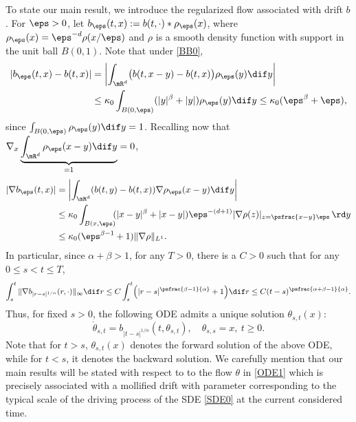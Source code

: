 To state our main result, we introduce the regularized flow associated with drift $b$.
For $\eps>0$, let $b_\eps(t,x):=b(t,\cdot)*\rho_\eps(x)$, where $\rho_\eps(x)=\eps^{-d}\rho(x/\eps)$
and $\rho$ is a smooth density function with support in the unit ball $B(0,1)$.
Note that under \eqref{BB0},
\begin{equation}
\begin{aligned}\label{LL19}
|b_\eps(t,x)-b(t,x)|&=
\left|\int_{\mR^d} \bigl(b(t,x-y)-b(t,x)\bigr)\rho_\eps(y)\dif y\right|\\
&\le 
\kappa_0 \int_{B(0,\eps)}( |y|^\beta+|y|) \rho_\eps(y)\dif y\leq \kappa_0(\eps^\beta+\eps),
\end{aligned}
\end{equation}
{since $\int_{B(0,\eps)}\rho_\eps(y)\dif y=1 $. Recalling now that $\nabla_x\underbrace{\int_{\mR^d} \rho_\eps(x-y) \dif y}_{=1}=0 $},
\begin{equation}
\begin{aligned}\label{LL1}
|\nabla b_\eps(t,x)|
&=\left|\int_{\mR^d}(b(t,y)-b(t,x))\nabla\rho_\eps(x-y)\dif y\right|\\
&\leq \kappa_0\int_{B(x,\eps)} \!\!(|x-y|^\beta+|x-y|) \eps^{-(d+1)}|\nabla \rho(z)|_{z=\psfrac{x-y}\eps}\,\rd y
\\
&\le  \kappa_0(\eps^{\beta-1}+1)\|\nabla\rho\|_{L^1}.
\end{aligned}
\end{equation}
In particular, since $\alpha+\beta>1$, for any $T>0$, there is a $C>0$ such that for any $0\leq s<t\leq T$,
\begin{equation}\label{LL01}
\int^t_s\|\nabla b_{|r-s|^{1/\alpha}}(r,\cdot)\|_\infty\dif r
\leq C
\int^t_s\Bigl(|r-s|^{\psfrac{\beta-1}{\alpha}}+1\Bigr)\dif r
\leq C(t-s)^{\psfrac{\alpha+\beta-1}{\alpha}}.
\end{equation}
Thus, for fixed $s>0$, the following ODE admits a unique solution $\theta_{s,t}(x)$:
\begin{equation}\label{ODE1}
\dot\theta_{s,t}=b_{|t-s|^{1/\alpha}}(t,\theta_{s,t}),\quad \theta_{s,s}=x,\ t\geq 0.
\end{equation}
Note that for $t>s$, $\theta_{s,t}(x)$ denotes the forward solution of the above ODE, while for $t<s$,
it denotes the backward solution. We carefully mention that our main results will be stated with respect to to the flow $\theta $ in \eqref{ODE1} which is precisely associated with a mollified drift with parameter corresponding to the typical scale of the driving process of the SDE \eqref{SDE0} at the current considered time.

